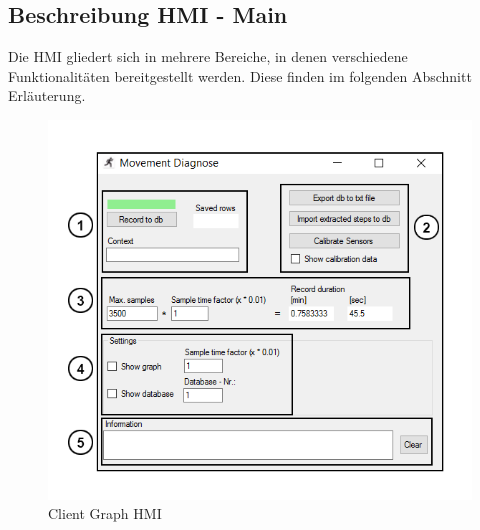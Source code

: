 \subsection{Beschreibung HMI - Main}
\label{kap:ClientGraphProgramm}
Die HMI gliedert sich in mehrere Bereiche, in denen verschiedene Funktionalitäten bereitgestellt werden. Diese finden im folgenden Abschnitt Erläuterung. 

\begin{figure}[H]
\centering
\includegraphics[width=1.0\linewidth]{Bilder/ClientGraph_Gui}
\caption[Client Graph HMI]{Client Graph HMI}
\label{fig:clientgraphgui}
\end{figure}

